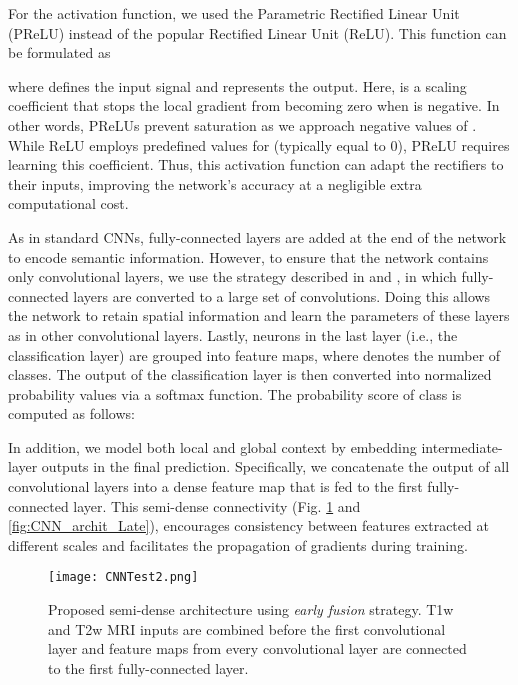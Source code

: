 \documentclass[twoside,espcrc2]{elsarticle}
\newcommand{\vold}[1]{}
\begin{document}
For the activation function, we used the Parametric Rectified Linear Unit (PReLU) \cite{he2015delving} instead of the popular Rectified Linear Unit (ReLU). This function can be formulated as

where  defines the input signal and  represents the output. Here,  is a scaling coefficient that stops the local gradient from becoming zero when  is negative. In other words, PReLUs prevent saturation as we approach negative values of . While ReLU employs predefined values for  (typically equal to 0), PReLU requires learning this coefficient. Thus, this activation function can adapt the rectifiers to their inputs, improving the network's accuracy at a negligible extra computational cost. 

As in standard CNNs, fully-connected layers are added at the end of the network to encode semantic information. However, to ensure that the network contains only convolutional layers, we use the strategy described in \cite{long2015fully} and \cite{kamnitsas2017efficient}, in which fully-connected layers are converted to a large set of \vold{1} convolutions. Doing this allows the network to retain spatial information and learn the parameters of these layers as in other convolutional layers. Lastly, neurons in the last layer (i.e., the classification layer) are grouped into  feature maps, where  denotes the number of classes. The output of the classification layer  is then converted into normalized probability values via a softmax function. The probability score of class  is computed as follows:

 
In addition, we model both local and global context by embedding intermediate-layer outputs in the final prediction. Specifically, we concatenate the output of all convolutional layers into a dense feature map that is fed to the first fully-connected layer. This semi-dense connectivity (Fig. \ref{fig:CNN_archit_Early} and \ref{fig:CNN_archit_Late}), encourages consistency between features extracted at different scales and facilitates the propagation of gradients during training. 






\begin{figure}[ht!]
\centering
\begin{center} 
        \texttt{[image: CNNTest2.png]}
\caption{Proposed semi-dense architecture using \textit{early fusion} strategy. T1w and T2w MRI inputs are combined before the first convolutional layer and feature maps from every convolutional layer are connected to the first fully-connected layer.}
\label{fig:CNN_archit_Early}
\end{center}        
\end{figure}
\end{document}
